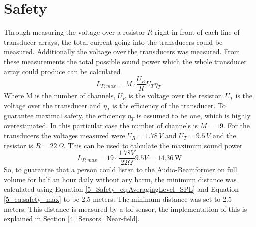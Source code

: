 \newpage
\section{Safety}
Through measuring the voltage over a resistor $R$ right in front of each line of transducer arrays, the total current going into the transducers could be measured. Additionally the voltage over the transducers was measured. From these measurements the total possible sound power which the whole transducer array could produce can be calculated
\begin{equation}
    L_{P,max} = M \cdot \frac{U_R}{R} U_{T}\eta_{T}.
\end{equation}
Where M is the number of channels, $U_R$ is the voltage over the resistor, $U_T$ is the voltage over the transducer and $\eta_{T}$ is the efficiency of the transducer. To guarantee maximal safety, the efficiency $\eta_{T}$ is assumed to be one, which is highly overestimated.
In this particular case the number of channels is $M = 19$. For the transducers the voltages measured were $U_R = 1.78 \, V$ and $U_T = 9.5 \, V $ and the resistor is $R = 22 \, \Omega$. This can be used to calculate the maximum sound power
\begin{equation}
     L_{P,max} = 19 \cdot \frac{1.78 V}{22 \Omega} 9.5 V = 14.36 \, \text{W}
\end{equation}
So, to guarantee that a person could listen to the Audio-Beamformer on full volume for half an hour daily without any harm, the minimum distance was calculated using Equation \ref{5_Safety_eq:AveragingLevel_SPL} and Equation \ref{5_eq:safety_max} to be 2.5 meters. The minimum distance was set to 2.5 meters. This distance is measured by a \acrfull{tof} sensor, the implementation of this is explained in Section \ref{4_Sensors_Near-field}.     
\newpage